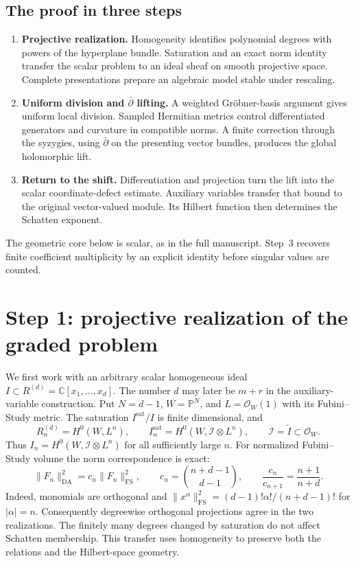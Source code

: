 \documentclass[11pt,reqno]{amsart}
\theoremstyle{remark}
\newcommand{\C}{\mathbb C}
\newcommand{\PP}{\mathbb P}
\newcommand{\cO}{\mathcal O}
\newcommand{\cI}{\mathscr I}
\newcommand{\FS}{\mathrm{FS}}
\newcommand{\DA}{\mathrm{DA}}
\begin{document}
\subsection*{The proof in three steps}
\begin{enumerate}
\item \textbf{Projective realization.}
Homogeneity identifies polynomial degrees with powers of the
hyperplane bundle. Saturation and an exact norm identity transfer the
scalar problem to an ideal sheaf on smooth projective space. Complete
presentations prepare an algebraic model stable under rescaling.
\item \textbf{Uniform division and $\bar\partial$ lifting.}
A weighted Gr\"obner-basis argument gives uniform local division.
Sampled Hermitian metrics control differentiated generators and
curvature in compatible norms. A finite correction through the
syzygies, using $\bar\partial$ on the presenting vector bundles,
produces the global holomorphic lift.
\item \textbf{Return to the shift.}
Differentiation and projection turn the lift into the scalar
coordinate-defect estimate. Auxiliary variables transfer that bound
to the original vector-valued module. Its Hilbert function then
determines the Schatten exponent.
\end{enumerate}
The geometric core below is scalar, as in the full manuscript.
Step~3 recovers finite coefficient multiplicity by an explicit
identity before singular values are counted.

\section{Step 1: projective realization of the graded problem}
\label{sec:step-one}

We first work with an arbitrary scalar homogeneous ideal
$I\subset R^{(d)}=\C[x_1,\ldots,x_d]$. The number $d$ may later be
$m+r$ in the auxiliary-variable construction. Put $N=d-1$,
$W=\PP^N$, and $L=\cO_W(1)$ with its Fubini--Study metric.
The saturation $I^{\mathrm{sat}}/I$ is finite dimensional, and
\[
 R^{(d)}_n=H^0(W,L^n),\qquad
 I_n^{\mathrm{sat}}=H^0(W,\cI\otimes L^n),\qquad
 \cI=\widetilde I\subset\cO_W.
\]
Thus $I_n=H^0(W,\cI\otimes L^n)$ for all sufficiently large $n$.
For normalized Fubini--Study volume the norm correspondence is exact:
\begin{equation}\label{eq:norm}
 \|F_n\|_{\DA}^2=c_n\|F_n\|_{\FS}^2,
 \qquad c_n=\binom{n+d-1}{d-1},\qquad
 \frac{c_n}{c_{n+1}}=\frac{n+1}{n+d}.
\end{equation}
Indeed, monomials are orthogonal and
$\|x^\alpha\|_{\FS}^2=(d-1)!\alpha!/(n+d-1)!$ for $|\alpha|=n$.
Consequently degreewise orthogonal projections agree in the two
realizations. The finitely many degrees changed by saturation do not
affect Schatten membership. This transfer uses homogeneity to
preserve both the relations and the Hilbert-space geometry.
\end{document}
